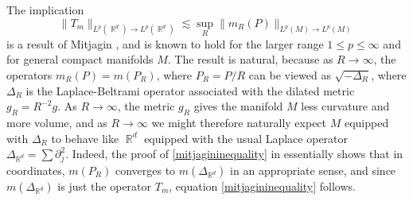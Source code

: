 \documentclass[dvipsnames,letterpaper,12pt]{article}
\DeclareMathOperator{\RR}{\mathbb{R}}
\begin{document}
The implication
%
\begin{equation}
\label{mitjagininequality}
    \| T_m \|_{L^p(\RR^d) \to L^p(\RR^d)} \lesssim \sup_R \| m_R(P) \|_{L^p(M) \to L^p(M)}
\end{equation}
%
is a result of Mitjagin \cite{Mitjagin}, and is known to hold for the larger range $1 \leq p \leq \infty$ and for general compact manifolds $M$. The result is natural, because as $R \to \infty$, the operators $m_R(P) = m(P_R)$, where $P_R = P/R$ can be viewed as $\sqrt{-\Delta_R}$, where $\Delta_R$ is the Laplace-Beltrami operator associated with the dilated metric $g_R = R^{-2} g$. As $R \to \infty$, the metric $g_R$ gives the manifold $M$ less curvature and more volume, and as $R \to \infty$ we might therefore naturally expect $M$ equipped with $\Delta_R$ to behave like $\RR^d$ equipped with the usual Laplace operator $\Delta_{\RR^d} = \sum \partial_j^2$. Indeed, the proof of \eqref{mitjagininequality} in \cite{Mitjagin} essentially shows that in coordinates, $m(P_R)$ converges to $m(\Delta_{\RR^d})$ in an appropriate sense, and since $m(\Delta_{\RR^d})$ is just the operator $T_m$, equation \eqref{mitjagininequality} follows.

\begin{comment}
%
\[ \widehat{m}(t) e^{2 \pi i t P/R} dt \]

one can write $m_R(P) = m(P_R)$, where $P_R = \sqrt{-\Delta_R}$ for the Laplace-Beltrami operator $\Delta_R$ of the manifold $M$, equipped with a rescaled metric $g_R = R^{-2} g$, and as $R \to \infty$, this rescaled metric becomes flatter and flatter, and $\text{Vol}(M,g_R) \sim R^d$.
\end{comment}
\end{document}
